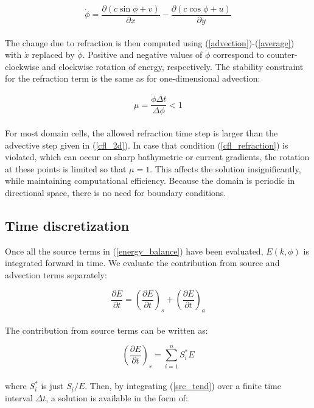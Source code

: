\documentclass[letterpaper]{article}
\numberwithin{equation}{section}
\begin{document}
\begin{equation}
\dot{\phi} = 
\dfrac{\partial (c\sin{\phi}+v)}{\partial x} - 
\dfrac{\partial (c\cos{\phi}+u)}{\partial y}
\end{equation}
\\
The change due to refraction is then computed using (\ref{advection})-(\ref{average}) with $\dot{x}$ replaced by $\dot{\phi}$. 
Positive and negative values of $\dot{\phi}$ correspond to 
counter-clockwise and clockwise rotation of energy, respectively.
The stability constraint for the refraction term is the same as for one-dimensional advection:

\begin{equation}
\mu = \dfrac{\dot{\phi}\Delta t}{\Delta \phi} < 1\label{cfl_refraction}
\end{equation}
\\
For most domain cells, the allowed refraction time step is larger than the advective step given in (\ref{cfl_2d}).
In case that condition (\ref{cfl_refraction}) is violated, which can occur on sharp bathymetric or current gradients,
the rotation at these points is limited so that $\mu = 1$.
This affects the solution insignificantly, while maintaining computational efficiency.
Because the domain is periodic in directional space, there is no need for boundary conditions.

\subsection{Time discretization}
\label{sec:time_discretization}

Once all the source terms in (\ref{energy_balance}) have been evaluated,
$E(k,\phi)$ is integrated forward in time.
We evaluate the contribution from source and advection terms separately:

\begin{equation}
\dfrac{\partial E}{\partial t}=\left(\dfrac{\partial E}{\partial t}\right)_{s}
                              +\left(\dfrac{\partial E}{\partial t}\right)_{a}
\end{equation}
\\
The contribution from source terms can be written as:

\begin{equation}
\left(\dfrac{\partial E}{\partial t}\right)_{s}=\displaystyle\sum_{i=1}^{n}S_{i}^{*}E
\label{src_tend}
\end{equation}
\\
where $S_{i}^{*}$ is just $S_{i}/E$.
Then, by integrating (\ref{src_tend}) over a finite time interval $\Delta t$,
a solution is available in the form of:
\end{document}
